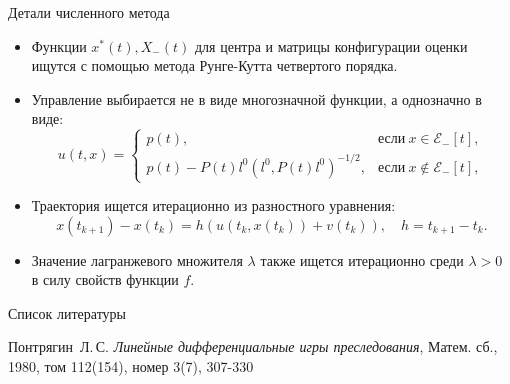 \documentclass{beamer}
\begin{document}
\begin{frame}{Детали численного метода}
\begin{itemize}
    \item Функции \( x^*(t), X_-(t) \) для центра и матрицы конфигурации оценки ищутся с помощью метода Рунге-Кутта четвертого порядка.
    \item Управление выбирается не в виде многозначной функции, а однозначно в виде:
    \begin{equation*}
        u(t,x) = 
        \begin{cases}
            p(t), & \text{если} \ x \in \mathcal{E}_-[t], \\
            p(t) - P(t)l^0(l^0, P(t)l^0)^{-1/2}, & \text{если} \ x \notin \mathcal{E}_-[t],
        \end{cases}
    \end{equation*}
    \item Траектория ищется итерационно из разностного уравнения:
        \begin{equation*}
            x(t_{k+1}) - x(t_k) = h(u(t_k, x(t_k)) + v(t_k)), \quad h = t_{k+1} - t_k.
        \end{equation*}
    \item Значение лагранжевого множителя \( \lambda \) также ищется итерационно среди \( \lambda > 0 \) в силу свойств функции \( f \).
\end{itemize}
    
\end{frame}

\begin{frame}{Список литературы}
    \begin{thebibliography}{0}
	 Понтрягин~Л.\,С.
	\emph{Линейные дифференциальные игры преследования}, Матем. сб., 1980, том 112(154), номер 3(7), 307-330
	
\end{thebibliography}
\end{frame}
\end{document}

